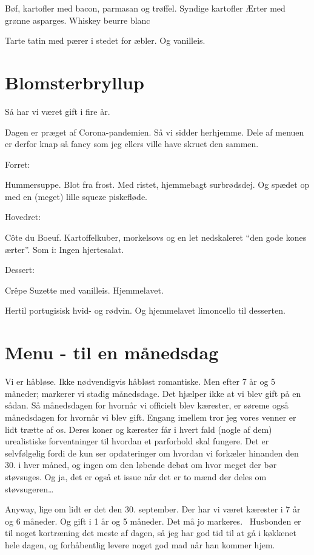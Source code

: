 \documentclass[
  letterpaper,
  DIV=11,
  numbers=noendperiod]{scrreprt}
\begin{document}
Bøf, kartofler med bacon, parmasan og trøffel. Syndige kartofler Ærter
med grønne asparges. Whiskey beurre blanc

Tarte tatin med pærer i stedet for æbler. Og vanilleis.

\hypertarget{blomsterbryllup}{%
\section{Blomsterbryllup}\label{blomsterbryllup}}

Så har vi været gift i fire år.

Dagen er præget af Corona-pandemien. Så vi sidder herhjemme. Dele af
menuen er derfor knap så fancy som jeg ellers ville have skruet den
sammen.

Forret:

Hummersuppe. Blot fra frost. Med ristet, hjemmebagt surbrødsdej. Og
spædet op med en (meget) lille squeze piskefløde.

Hovedret:

Côte du Boeuf. Kartoffelkuber, morkelsovs og en let nedskaleret ``den
gode kones ærter''. Som i: Ingen hjertesalat.

Dessert:

Crêpe Suzette med vanilleis. Hjemmelavet.

Hertil portugisisk hvid- og rødvin. Og hjemmelavet limoncello til
desserten.

\hypertarget{menu---til-en-muxe5nedsdag}{%
\section{Menu - til en månedsdag}\label{menu---til-en-muxe5nedsdag}}

Vi er håbløse. Ikke nødvendigvis håbløst romantiske. Men efter 7 år og 5
måneder; markerer vi stadig månedsdage. Det hjælper ikke at vi blev gift
på en sådan. Så månedsdagen for hvornår vi officielt blev kærester, er
søreme også månedsdagen for hvornår vi blev gift. Engang imellem tror
jeg vores venner er lidt trætte af os. Deres koner og kærester får i
hvert fald (nogle af dem) urealistiske forventninger til hvordan et
parforhold skal fungere. Det er selvfølgelig fordi de kun ser
opdateringer om hvordan vi forkæler hinanden den 30. i hver måned, og
ingen om den løbende debat om hvor meget der bør støvsuges. Og ja, det
er også et issue når det er to mænd der deles om støvsugeren\ldots{}

Anyway, lige om lidt er det den 30. september. Der har vi været kærester
i 7 år og 6 måneder. Og gift i 1 år og 5 måneder. Det må jo markeres.
~Husbonden er til noget kortræning det meste af dagen, så jeg har god
tid til at gå i køkkenet hele dagen, og forhåbentlig levere noget god
mad når han kommer hjem.
\end{document}
